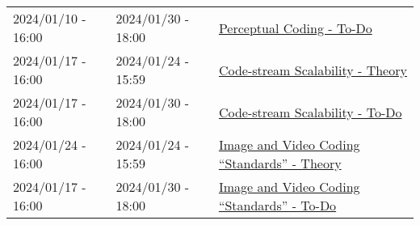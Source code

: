 \begin{tabular}{|l|l|l|}
  2024/01/10 - 16:00 & 2024/01/30 - 18:00 & \href{https://sistemas-multimedia.github.io/contents/perceptual_coding/#x1-100009}{Perceptual Coding - To-Do} \\
  2024/01/17 - 16:00 & 2024/01/24 - 15:59 & \href{https://sistemas-multimedia.github.io/contents/data_scalability/}{Code-stream Scalability - Theory} \\
  2024/01/17 - 16:00 & 2024/01/30 - 18:00 & \href{https://sistemas-multimedia.github.io/contents/data_scalability/#x1-150008}{Code-stream Scalability - To-Do} \\
  2024/01/24 - 16:00 & 2024/01/24 - 15:59 & \href{https://sistemas-multimedia.github.io/contents/standards/}{Image and Video Coding ``Standards'' - Theory} \\
  2024/01/17 - 16:00 & 2024/01/30 - 18:00 & \href{https://sistemas-multimedia.github.io/contents/standards/#x1-40003/}{Image and Video Coding ``Standards'' - To-Do} \\
  \hline
\end{tabular}

